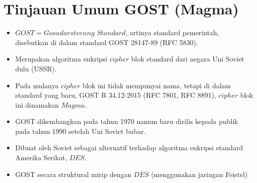 \documentclass{article}
\begin{document}

\section*{Tinjauan Umum GOST (Magma)}

\begin{itemize}
    \item $GOST = Gosudarstvenny$ $Standard$, artinya standard pemerintah, disebutkan di dalam standard GOST 28147-89 (RFC 5830).
    \item Merupakan algoritma enkripsi $cipher$ blok standard dari negara Uni Soviet dulu (USSR).
    \item Pada mulanya $cipher$ blok ini tidak mempunyai nama, tetapi di dalam standard yang baru, GOST R 34.12-2015 (RFC 7801, RFC 8891), $cipher$ blok ini dinamakan $Magma$.
    \item GOST dikembangkan pada tahun 1970 namun baru dirilis kepada publik pada tahun 1990 setelah Uni Soviet bubar.
    \item Dibuat oleh Soviet sebagai alternatif terhadap algoritma enkripsi standard Amerika Serikat, $DES$.
    \item GOST secara struktural mirip dengan $DES$ (menggunakan jaringan Feistel)
\end{itemize}
\end{document}
